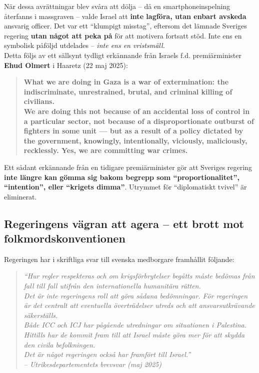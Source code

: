 \noindent
När dessa avrättningar blev svåra att dölja – då en smartphoneinspelning återfanns i massgraven – valde Israel att \textbf{inte lagföra, utan enbart avskeda} ansvarig officer. Det var ett \enquote{klumpigt misstag}, eftersom det lämnade Sveriges regering \textbf{utan något att peka på} för att motivera fortsatt stöd. Inte ens en symbolisk påföljd utdelades – \textit{inte ens en vristsmäll.}\\

\noindent
Detta följs av ett sällsynt tydligt erkännande från Israels f.d. premiärminister \textbf{Ehud Olmert} i Haaretz (22 maj 2025):\\

\begin{quote}
\bfseries
What we are doing in Gaza is a war of extermination: the indiscriminate, unrestrained, brutal, and criminal killing of civilians.\\

We are doing this not because of an accidental loss of control in a particular sector, not because of a disproportionate outburst of fighters in some unit — but as a result of a policy dictated by the government, knowingly, intentionally, viciously, maliciously, recklessly. Yes, we are committing war crimes.
\normalfont
\end{quote}

\noindent
Ett sådant erkännande från en tidigare premiärminister gör att Sveriges regering \textbf{inte längre kan gömma sig bakom begrepp som \enquote{proportionalitet}, \enquote{intention}, eller \enquote{krigets dimma}}. Utrymmet för \enquote{diplomatiskt tvivel} är eliminerat.

\newpage
\subsection*{Regeringens vägran att agera – ett brott mot folkmordskonventionen}

Regeringen har i skriftliga svar till svenska medborgare framhållit följande:
\begin{quote}
\noindent
\textit{“Hur regler respekteras och om krigsförbrytelser begåtts måste bedömas från fall till fall utifrån den internationella humanitära rätten.}\\
\textit{Det är inte regeringens roll att göra sådana bedömningar. För regeringen är det centralt att eventuella överträdelser utreds och att ansvarsutkrävande säkerställs.}\\
\textit{Både ICC och ICJ har pågående utredningar om situationen i Palestina.}
\textit{Hittills har de kommit fram till att Israel måste göra mer för att skydda den civila befolkningen.}\\
\textit{Det är något regeringen också har framfört till Israel.”}\\
\textit{– Utrikesdepartementets brevsvar (maj 2025)}
\end{quote}

